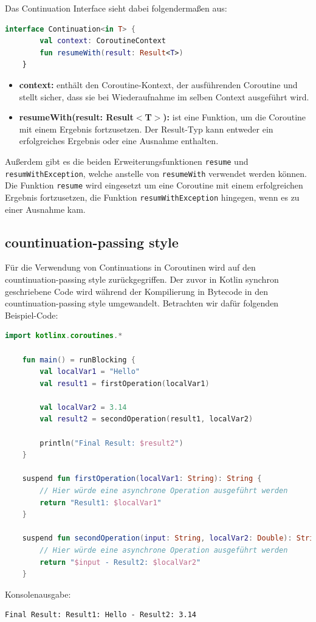 \documentclass[fontsize=12pt,paper=a4,twoside=semi,parskip=half-,headsepline,headinclude]{scrreprt}
\begin{document}
Das Continuation Interface sieht dabei folgendermaßen aus:

\begin{lstlisting}[language=Kotlin]
	interface Continuation<in T> {
		val context: CoroutineContext
		fun resumeWith(result: Result<T>)
	}
\end{lstlisting}

\begin{itemize}
	\item \textbf{context:} enthält den Coroutine-Kontext, der ausführenden Coroutine und stellt sicher, dass sie bei Wiederaufnahme im selben Context ausgeführt wird.
	\item \textbf{resumeWith(result: Result$<$T$>$):} ist eine Funktion, um die Coroutine mit einem Ergebnis fortzusetzen. Der Result-Typ kann entweder ein erfolgreiches Ergebnis oder eine Ausnahme enthalten.
\end{itemize}

Außerdem gibt es die beiden Erweiterungsfunktionen \texttt{resume} und \texttt{resumWithException}, welche anstelle von \texttt{resumeWith} verwendet werden können. Die Funktion \texttt{resume} wird eingesetzt um eine Coroutine mit einem erfolgreichen Ergebnis fortzusetzen, die Funktion \texttt{resumWithException} hingegen, wenn es zu einer Ausnahme kam.


\subsection{countinuation-passing style}
\label{subsec:csp}

Für die Verwendung von Continuations in Coroutinen wird auf den countinuation-passing style\cite{sus75} zurückgegriffen. Der zuvor in Kotlin synchron geschriebene Code wird während der Kompilierung in Bytecode in den countinuation-passing style umgewandelt\cite{Elizarov2017b}. Betrachten wir dafür folgenden Beispiel-Code:

\begin{lstlisting}[language=Kotlin]
	import kotlinx.coroutines.*

	fun main() = runBlocking {
		val localVar1 = "Hello"
		val result1 = firstOperation(localVar1)
	
		val localVar2 = 3.14
		val result2 = secondOperation(result1, localVar2)
	
		println("Final Result: $result2")
	}

	suspend fun firstOperation(localVar1: String): String {
		// Hier würde eine asynchrone Operation ausgeführt werden
		return "Result1: $localVar1"
	}

	suspend fun secondOperation(input: String, localVar2: Double): String {
		// Hier würde eine asynchrone Operation ausgeführt werden
		return "$input - Result2: $localVar2"
	}
\end{lstlisting}
Konsolenausgabe:
\begin{lstlisting}[frame=shadowbox, rulecolor=\color{black}, backgroundcolor=\color{gray!10}]
	Final Result: Result1: Hello - Result2: 3.14
\end{lstlisting}
\end{document}
